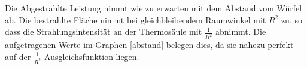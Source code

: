 Die Abgestrahlte Leistung nimmt wie zu erwarten mit dem Abstand vom Würfel ab. Die bestrahlte Fläche nimmt bei gleichbleibendem Raumwinkel mit $R^2$ zu, so dass die Strahlungsintensität an der Thermosäule mit $\frac{1}{R^2}$ abnimmt. Die aufgetragenen Werte im Graphen \eqref{abstand} belegen dies, da sie nahezu perfekt auf der $\frac{1}{R^2}$ Ausgleichsfunktion liegen.







